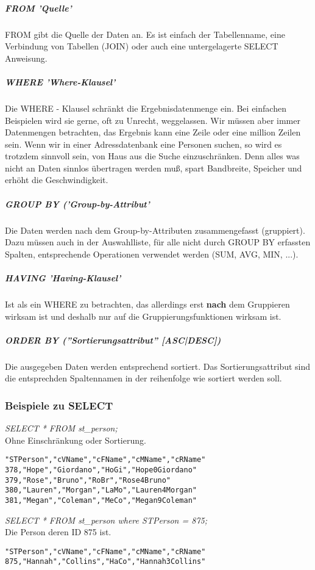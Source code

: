 \subparagraph{FROM 'Quelle'}
FROM gibt die Quelle der Daten an. Es ist einfach der Tabellenname, eine Verbindung von Tabellen (JOIN) oder auch eine untergelagerte SELECT Anweisung.

\subparagraph{WHERE 'Where-Klausel'}
Die WHERE - Klausel schränkt die Ergebnisdatenmenge ein. Bei einfachen Beispielen wird sie gerne, oft zu Unrecht, weggelassen. Wir müssen aber immer Datenmengen betrachten, das Ergebnis kann eine Zeile oder eine million Zeilen sein. Wenn wir in einer Adressdatenbank eine Personen suchen, so wird es trotzdem sinnvoll sein, von Haus aus die Suche einzuschränken. Denn alles was nicht an Daten sinnlos übertragen werden muß, spart Bandbreite, Speicher und erhöht die Geschwindigkeit.

\subparagraph{GROUP BY ('Group-by-Attribut'}
Die Daten werden nach dem Group-by-Attributen zusammengefasst (gruppiert). Dazu müssen auch in der Auswahlliste, für alle nicht durch GROUP BY erfassten Spalten, entsprechende Operationen verwendet werden (SUM, AVG, MIN, ...).

\subparagraph{HAVING 'Having-Klausel'}
Ist als ein WHERE zu betrachten, das allerdings erst \textbf{nach} dem Gruppieren wirksam ist und deshalb nur auf die Gruppierungsfunktionen wirksam ist.

\subparagraph{ORDER BY (''Sortierungsattribut'' [ASC|DESC])}
Die ausgegeben Daten werden entsprechend sortiert. Das Sortierungsattribut sind die entsprechden Spaltennamen in der reihenfolge wie sortiert werden soll.

\subsubsection{Beispiele zu SELECT}

\emph{SELECT * FROM st\_person; }\\
Ohne Einschränkung oder Sortierung. 
\begin{verbatim}
"STPerson","cVName","cFName","cMName","cRName"
378,"Hope","Giordano","HoGi","Hope0Giordano"
379,"Rose","Bruno","RoBr","Rose4Bruno"
380,"Lauren","Morgan","LaMo","Lauren4Morgan"
381,"Megan","Coleman","MeCo","Megan9Coleman"
\end{verbatim}

\emph{SELECT * FROM st\_person where STPerson = 875;}\\
Die Person deren ID 875 ist.
\begin{verbatim}
"STPerson","cVName","cFName","cMName","cRName"
875,"Hannah","Collins","HaCo","Hannah3Collins"
\end{verbatim}

